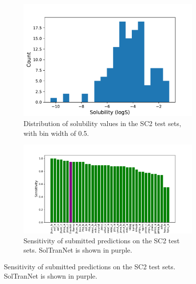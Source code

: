 \documentclass[journal=jmcmar,manuscript=article]{achemso}
\begin{document}
\begin{figure}[tb]
    \centering
    \begin{subfigure}[t]{0.48\textwidth}
        \centering
        \includegraphics[width=\linewidth]{figures/histogram_solchal2_true_logs.pdf}
        \caption{Distribution of solubility values in the SC2 test sets, with bin width of 0.5.}
    \end{subfigure}%
    \hfill
    \begin{subfigure}[t]{0.48\textwidth}
        \centering
        \includegraphics[width=\linewidth]{figures/hit_-4_solchal2.pdf}
        \caption{Sensitivity of submitted predictions on the SC2 test sets. SolTranNet is shown in purple.}
    \end{subfigure}
    

\end{figure}
\end{document}
